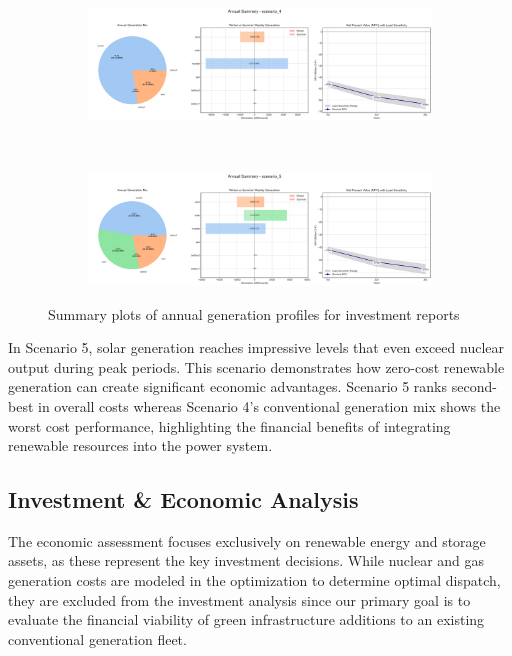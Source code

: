 \begin{figure}[h]
    \centering
    \begin{subfigure}[b]{0.9\textwidth}
        \includegraphics[width=\textwidth]{images/annual_4.png}
        \label{fig:annual_4}
    \end{subfigure}
    \\[\baselineskip]
    \begin{subfigure}[b]{0.9\textwidth}
        \includegraphics[width=\textwidth]{images/annual_5.png}
        \label{fig:annual_5}
    \end{subfigure}
    \caption{Summary plots of annual generation profiles for investment reports}
    \label{fig:annual_comparison}
\end{figure}

In Scenario 5, solar generation reaches impressive levels that even exceed nuclear output during peak 
periods. This scenario demonstrates how zero-cost renewable generation can create significant economic advantages.
Scenario 5 ranks second-best in overall costs whereas Scenario 4's conventional generation mix shows the worst 
cost performance, highlighting the financial benefits of integrating renewable resources into the power system.

\subsection{Investment \& Economic Analysis}
\label{sec:investment_econ}

The economic assessment focuses exclusively on renewable energy and storage assets, as these represent the key investment 
decisions. While nuclear and gas generation costs are modeled in the optimization to determine optimal dispatch, they are 
excluded from the investment analysis since our primary goal is to evaluate the financial viability of green infrastructure 
additions to an existing conventional generation fleet.

